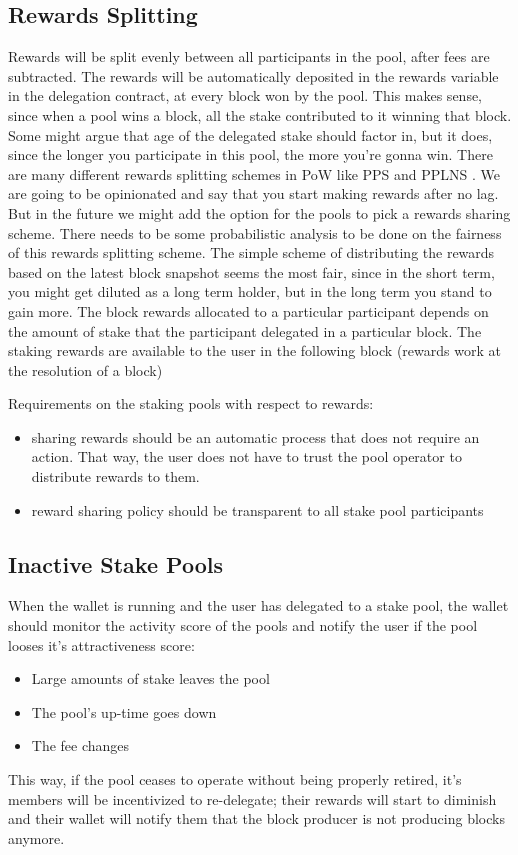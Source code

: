 \subsection{Rewards Splitting}
Rewards will be split evenly between all participants in the pool, after fees are subtracted. The rewards will be automatically deposited in the rewards variable in the delegation contract, at every block won by the pool. This makes sense, since when a pool wins a block, all the stake contributed to it winning that block. Some might argue that age of the delegated stake should factor in, but it does, since the longer you participate in this pool, the more you're gonna win. There are many different rewards splitting schemes in PoW like PPS and PPLNS \cite{Coi18}. We are going to be opinionated and say that you start making rewards after no lag. But in the future we might add the option for the pools to pick a rewards sharing scheme. There needs to be some probabilistic analysis to be done on the fairness of this rewards splitting scheme. The simple scheme of distributing the rewards based on the latest block snapshot seems the most fair, since in the short term, you might get diluted as a long term holder, but in the long term you stand to gain more. The block rewards allocated to a particular participant depends on the amount of stake that the participant delegated in a particular block. The staking rewards are available to the user in the following block (rewards work at the resolution of a block)

Requirements on the staking pools with respect to rewards:
\begin{itemize}
    \item sharing rewards should be an automatic process that does not require an action. That way, the user does not have to trust the pool operator to distribute rewards to them. 
    \item reward sharing policy should be transparent to all stake pool participants
\end{itemize}

\subsection{Inactive Stake Pools}
When the wallet is running and the user has delegated to a stake pool, the wallet should monitor the activity score of the pools and notify the user if the pool looses it's attractiveness score: 
\begin{itemize}
    \item Large amounts of stake leaves the pool
    \item The pool's up-time goes down
    \item The fee changes
\end{itemize}
This way, if the pool ceases to operate without being properly retired, it's members will be incentivized to re-delegate; their rewards will start to diminish and their wallet will notify them that the block producer is not producing blocks anymore. 

